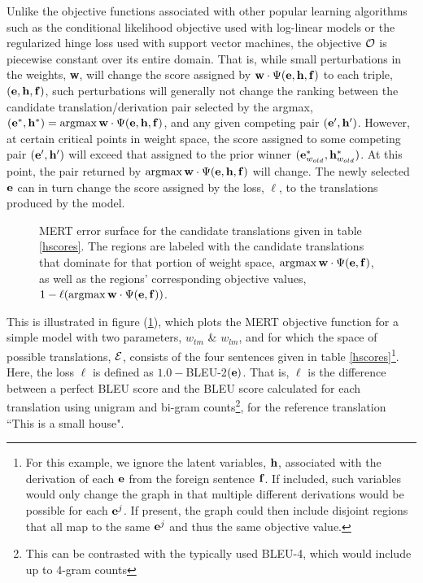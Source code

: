 \documentclass[11pt]{article}
\DeclareMathOperator*{\argmax}{argmax}
\begin{document}
Unlike the objective functions associated with other popular learning algorithms such as the conditional likelihood objective used with log-linear models or the regularized hinge loss used with support vector machines, the objective \mbox{${\cal O}$} is piecewise constant over its entire domain. That is, while small perturbations in the weights, {\bf w}, will change the score assigned by \mbox{${\bf w} \cdot \Psi({\bf e}, {\bf h}, {\bf f})$} to each triple, \mbox{$({\bf e}, {\bf h}, {\bf f})$}, such perturbations will generally not change the ranking between the candidate translation/derivation pair selected by the argmax,  \mbox{$({\bf e}^*, {\bf h}^*) = \argmax {\bf w} \cdot \Psi({\bf e}, {\bf h}, {\bf f})$}, and any given competing pair \mbox{$({\bf e}^\prime, {\bf h}^\prime)$}. However, at certain critical points in weight space, the score assigned to some competing pair \mbox{$({\bf e}^\prime, {\bf h}^\prime)$} will exceed that assigned to the prior winner  \mbox{$({\bf e}^*_{w_{old}}, {\bf h}^*_{w_{old}})$}. At this point, the pair returned by \mbox{$\argmax {\bf w} \cdot \Psi({\bf e}, {\bf h}, {\bf f})$} will change. The newly selected \mbox{${\bf e}$}  can in turn change the score assigned by the loss, \mbox{$\ell$}, to the translations produced by the model.


\begin{figure}[h]
\vskip 0.2in
\begin{center}
\setlength{\epsfxsize}{3.0in}
\centerline{}
\vskip -0.15in
\caption{MERT error surface for the candidate translations given in table \ref{hscores}. The regions are labeled with the candidate translations that dominate for that portion of weight space, \mbox{$\argmax {\bf w} \cdot \Psi({\bf e}, {\bf f})$}, as well as the regions' corresponding objective values, \mbox{$1-\ell(\argmax {\bf w} \cdot \Psi({\bf e}, {\bf f}))$}. 
\label{mertsurface}
}
\end{center}
\vskip -0.2in
\end{figure}


This is illustrated in figure (\ref{mertsurface}), which plots the MERT objective function for a simple model with two parameters, \mbox{$w_{tm}$} \& \mbox{$w_{lm}$}, and for which the space of possible translations, \mbox{${\cal E}$}, consists of the four sentences given in table \ref{hscores}\footnote{For this example, we ignore the latent variables, \mbox{${\bf h}$}, associated with the derivation of each \mbox{${\bf e}$} from the foreign sentence \mbox{${\bf f}$}. If included, such variables would only change the graph in that  multiple different derivations would be possible for each \mbox{${\bf e}^j$}. If present, the graph could then include disjoint regions that all map to the same \mbox{${\bf e}^j$} and thus the same objective value.}. Here, the loss \mbox{$\ell$} is defined as \mbox{$1.0 - $}BLEU-2\mbox{$({\bf e})$}. That is, \mbox{$\ell$} is the difference between a perfect BLEU score and the BLEU score calculated for each translation using unigram and bi-gram counts\footnote{This can be contrasted with the typically used BLEU-4, which would include up to 4-gram counts}, for the reference translation ``This is a small house". 
\end{document}
